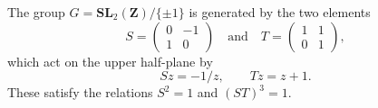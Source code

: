 The group $G = \mathbf{SL}_2(\mathbf{Z}) / \{\pm 1\}$ is generated by the two elements
$$S = \begin{pmatrix} 0 & -1 \\ 1 & 0 \end{pmatrix} \quad \text{and} \quad T = \begin{pmatrix} 1 & 1 \\ 0 & 1 \end{pmatrix},$$
which act on the upper half-plane by
$$Sz = -1/z, \qquad Tz = z + 1.$$
These satisfy the relations $S^2 = 1$ and $(ST)^3 = 1$.

